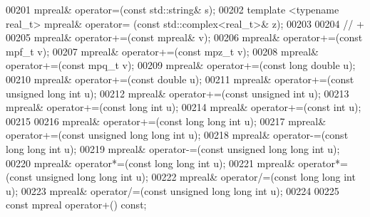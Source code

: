\begin{DoxyCode}
00201     mpreal& operator=(\textcolor{keyword}{const} std::string& s);
00202     \textcolor{keyword}{template} <\textcolor{keyword}{typename} real\_t> mpreal& operator= (\textcolor{keyword}{const} std::complex<real\_t>& z);
00203 
00204     \textcolor{comment}{// +}
00205     mpreal& operator+=(\textcolor{keyword}{const} mpreal& v);
00206     mpreal& operator+=(\textcolor{keyword}{const} mpf\_t v);
00207     mpreal& operator+=(\textcolor{keyword}{const} mpz\_t v);
00208     mpreal& operator+=(\textcolor{keyword}{const} mpq\_t v);
00209     mpreal& operator+=(\textcolor{keyword}{const} \textcolor{keywordtype}{long} \textcolor{keywordtype}{double} u);
00210     mpreal& operator+=(\textcolor{keyword}{const} \textcolor{keywordtype}{double} u);
00211     mpreal& operator+=(\textcolor{keyword}{const} \textcolor{keywordtype}{unsigned} \textcolor{keywordtype}{long} \textcolor{keywordtype}{int} u);
00212     mpreal& operator+=(\textcolor{keyword}{const} \textcolor{keywordtype}{unsigned} \textcolor{keywordtype}{int} u);
00213     mpreal& operator+=(\textcolor{keyword}{const} \textcolor{keywordtype}{long} \textcolor{keywordtype}{int} u);
00214     mpreal& operator+=(\textcolor{keyword}{const} \textcolor{keywordtype}{int} u);
00215 
00216     mpreal& operator+=(\textcolor{keyword}{const} \textcolor{keywordtype}{long} \textcolor{keywordtype}{long} \textcolor{keywordtype}{int}  u);
00217     mpreal& operator+=(\textcolor{keyword}{const} \textcolor{keywordtype}{unsigned} \textcolor{keywordtype}{long} \textcolor{keywordtype}{long} \textcolor{keywordtype}{int} u);
00218     mpreal& operator-=(\textcolor{keyword}{const} \textcolor{keywordtype}{long} \textcolor{keywordtype}{long} \textcolor{keywordtype}{int}  u);
00219     mpreal& operator-=(\textcolor{keyword}{const} \textcolor{keywordtype}{unsigned} \textcolor{keywordtype}{long} \textcolor{keywordtype}{long} \textcolor{keywordtype}{int} u);
00220     mpreal& operator*=(\textcolor{keyword}{const} \textcolor{keywordtype}{long} \textcolor{keywordtype}{long} \textcolor{keywordtype}{int}  u);
00221     mpreal& operator*=(\textcolor{keyword}{const} \textcolor{keywordtype}{unsigned} \textcolor{keywordtype}{long} \textcolor{keywordtype}{long} \textcolor{keywordtype}{int} u);
00222     mpreal& operator/=(\textcolor{keyword}{const} \textcolor{keywordtype}{long} \textcolor{keywordtype}{long} \textcolor{keywordtype}{int}  u);
00223     mpreal& operator/=(\textcolor{keyword}{const} \textcolor{keywordtype}{unsigned} \textcolor{keywordtype}{long} \textcolor{keywordtype}{long} \textcolor{keywordtype}{int} u);
00224 
00225     \textcolor{keyword}{const} mpreal operator+() \textcolor{keyword}{const};

\end{DoxyCode}
